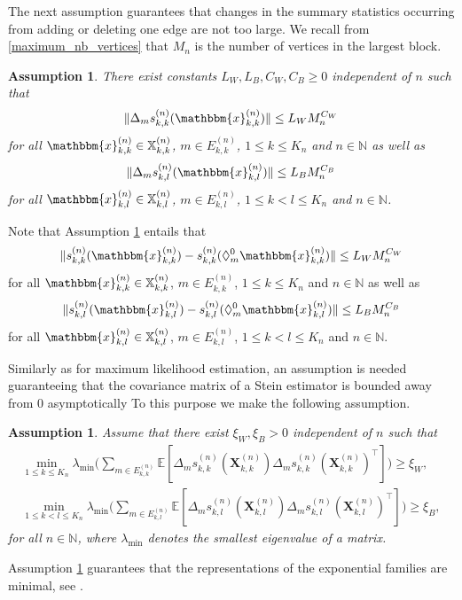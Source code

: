 \documentclass{article}
\newtheorem{Assumption}[Theorem]{Assumption}
\begin{document}
The next assumption guarantees that changes in the summary statistics occurring from adding or deleting one edge are not too large.  We recall from \eqref{maximum_nb_vertices} that $M_n$ is the number of vertices in the largest block.
\begin{Assumption}  \label{ass_growth_statis}
There exist constants $L_W,L_B,C_W,C_B \geq 0$ independent of $n$ such that
\begin{align*}
    \Vert \Delta_m s_{k,k}^{(n)}(\mathbbm{x}_{k,k}^{(n)}) \Vert \leq L_W   M_n^{C_W} 
\end{align*}
for all $\mathbbm{x}_{k,k}^{(n)} \in \mathbb{X}_{k,k}^{(n)}$, $m \in E_{k,k}^{(n)}$, $1 \leq k \leq K_n$ and $n \in \mathbb{N}$ as well as
\begin{align*}  
    \Vert \Delta_m s_{k,l}^{(n)}(\mathbbm{x}_{k,l}^{(n)}) \Vert \leq L_B  M_n^{C_B} 
\end{align*}
for all $\mathbbm{x}_{k,l}^{(n)} \in \mathbb{X}_{k,l}^{(n)}$, $m \in E_{k,l}^{(n)}$, $1 \leq k <l \leq K_n$ and $n \in \mathbb{N}$.
\end{Assumption}
Note that Assumption \ref{ass_growth_statis} entails that
\begin{align*}
    \Vert s_{k,k}^{(n)}(\mathbbm{x}_{k,k}^{(n)}) -s_{k,k}^{(n)}(\Diamond_{m}^{0} \mathbbm{x}_{k,k}^{(n)}) \Vert \leq L_W   M_n^{C_W} 
\end{align*}
for all $\mathbbm{x}_{k,k}^{(n)} \in \mathbb{X}_{k,k}^{(n)}$, $m \in E_{k,k}^{(n)}$, $1 \leq k \leq K_n$ and $n \in \mathbb{N}$ as well as
\begin{align*}  
    \Vert s_{k,l}^{(n)}(\mathbbm{x}_{k,l}^{(n)}) -s_{k,l}^{(n)}(\Diamond_{m}^{0} \mathbbm{x}_{k,l}^{(n)}) \Vert \leq L_B  M_n^{C_B} 
\end{align*}
for all $\mathbbm{x}_{k,l}^{(n)} \in \mathbb{X}_{k,l}^{(n)}$, $m \in E_{k,l}^{(n)}$, $1 \leq k <l \leq K_n$ and $n \in \mathbb{N}$.


Similarly as for maximum likelihood estimation, an assumption is needed guaranteeing that the covariance matrix of a Stein estimator is bounded away from 0 asymptotically To this purpose we make the following assumption.
\begin{Assumption}  \label{ass_min_eig_statis}
Assume that there exist $\xi_W,\xi_B>0$ independent of $n$ such that
\begin{align*}
    \min_{1 \leq k \leq K_n} \lambda_\mathrm{min} \bigg( \sum_{m \in E_{k,k}^{(n)}} \mathbb{E}[\Delta_m s_{k,k}^{(n)}(\mathbf{X}_{k,k}^{(n)}) \Delta_m s_{k,k}^{(n)}(\mathbf{X}_{k,k}^{(n)})^{\top}] \bigg) \geq \xi_W,  \\
    \min_{1 \leq k<l \leq K_n} \lambda_{\mathrm{min}} \bigg( \sum_{m \in E_{k,l}^{(n)}} \mathbb{E}[\Delta_m s_{k,l}^{(n)}(\mathbf{X}_{k,l}^{(n)}) \Delta_m s_{k,l}^{(n)}(\mathbf{X}_{k,l}^{(n)})^{\top}] \bigg) \geq \xi_B,
\end{align*}
for all $n \in \mathbb{N}$,  where $\lambda_{\mathrm{min}}$ denotes the smallest eigenvalue of a matrix.
\end{Assumption}
Assumption \ref{ass_min_eig_statis} guarantees that the representations of the exponential families are minimal, see \cite[Chapter 1]{brown1986fundamentals}.
\end{document}

